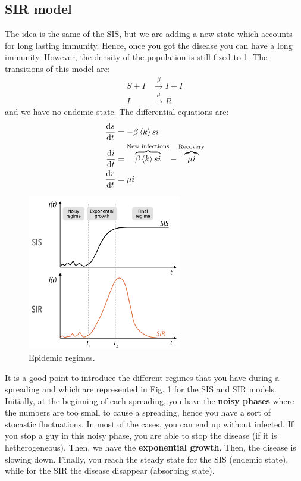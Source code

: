 \documentclass[../main/main.tex]{subfiles}
\begin{document}
\subsection{SIR model}
The idea is the same of the SIS, but we are adding a new state which accounts for long lasting immunity. Hence, once you got the disease you can have a long immunity. However, the density of the population is still fixed to 1. The transitions of this model are:
\begin{equation}
\begin{split}
  S + I &\overset{\beta }{\rightarrow } I + I  \\
  I &\overset{\mu }{\rightarrow } R
\end{split}
\end{equation}
and we have no endemic state.
The differential equations are:
\begin{equation}
\begin{split}
  \dv{s}{t} &= - \beta \expval{k} si  \\
  \dv{i}{t} &= \overbrace{\beta \expval{k} si}^{\text{New infections}}  - \overbrace{\mu i}^{\text{Recovery}} \\
  \dv{r}{t} &= \mu i
\end{split}
\end{equation}

\begin{figure}[h!]
\centering
\includegraphics[width=0.6\textwidth]{../lessons/image/03/6.png}
\caption{\label{fig:3_6} Epidemic regimes.}
\end{figure}

It is a good point to introduce the different regimes that you have during a spreading and which are represented in Fig. \ref{fig:3_6} for the  SIS and SIR models.
Initially, at the beginning of each spreading, you have the \textbf{noisy phases} where the numbers are too small to cause a spreading, hence you have a sort of stocastic fluctuations. In most of the cases, you can end up without infected. If you stop a guy in this noisy phase, you are able to stop the disease (if it is hetherogeneous). Then, we have the \textbf{exponential growth}. Then, the disease is slowing down. Finally, you reach the steady state for the SIS (endemic state), while for the SIR the disease disappear (absorbing state).
\end{document}
